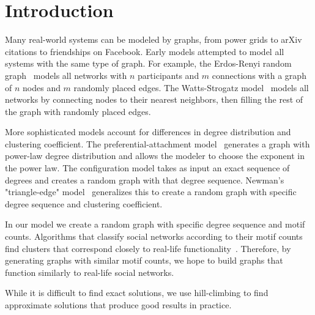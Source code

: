 \section{Introduction}
\label{sec:intro}

Many real-world systems can be modeled by graphs, from power grids to arXiv citations to friendships on Facebook.  Early models attempted to model all systems with the same type of graph.  For example, the Erdos-Renyi random graph~\cite{erdds1959random}\cite{erdos1960random} models all networks with $n$ participants and $m$ connections with a graph of $n$ nodes and $m$ randomly placed edges.  The Watts-Strogatz model~\cite{watts1998collective} models all networks by connecting nodes to their nearest neighbors, then filling the rest of the graph with randomly placed edges.

More sophisticated models account for differences in degree distribution and clustering coefficient.  The preferential-attachment model~\cite{albert2002statistical} generates a graph with power-law degree distribution and allows the modeler to choose the exponent in the power law.  The configuration model takes as input an exact sequence of degrees and creates a random graph with that degree sequence.  Newman's "triangle-edge" model~\cite{newman2009random} generalizes this to create a random graph with specific degree sequence and clustering coefficient.

In our model we create a random graph with specific degree sequence and motif counts.  Algorithms that classify social networks according to their motif counts find clusters that correspond closely to real-life functionality~\cite{chuanqi}.  Therefore, by generating graphs with similar motif counts, we hope to build graphs that function similarly to real-life social networks.

While it is difficult to find exact solutions, we use hill-climbing to find approximate solutions that produce good results in practice.
